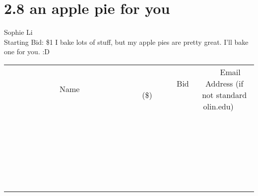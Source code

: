 \documentclass[11pt]{article}
\begin{document}
\section*{2.8 an apple pie for you}
Sophie Li
\\
Starting Bid: \$1
\newline
I bake lots of stuff, but my apple pies are pretty great. I'll bake one for you. :D
\\[6ex]
\begin{tabular}{c c c}
~~~~~~~~~~~~~Name~~~~~~~~~~~~~ & ~~~~~~~~~Bid (\$)~~~~~~~~~  & ~~~Email Address (if not standard olin.edu)~~~\\
 & & \\
\hline
 & & \\
\hline
 & & \\
\hline
 & & \\
\hline
 & & \\
\hline
 & & \\
\hline
 & & \\
\hline
 & & \\
\hline
 & & \\
\hline
 & & \\
\hline
 & & \\
\hline
 & & \\
\hline
 & & \\
\hline
 & & \\
\hline
 & & \\
\hline
 & & \\
\hline
 & & \\
\hline
 & & \\
\hline
 & & \\
\hline
 & & \\
\hline
 & & \\
\hline
 & & \\
\hline
 & & \\
\hline
 & & \\
\hline
 & & \\
\hline
 & & \\
\hline
\end{tabular}
\newpage
\end{document}
